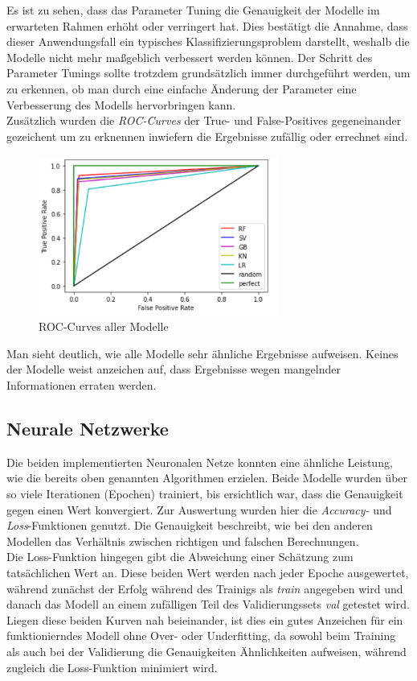 Es ist zu sehen, dass das Parameter Tuning die Genauigkeit der Modelle im erwarteten Rahmen erhöht oder 
verringert hat. Dies bestätigt die Annahme, dass dieser Anwendungsfall ein typisches Klassifizierungsproblem 
darstellt, weshalb die Modelle nicht mehr maßgeblich verbessert werden können. Der Schritt des Parameter Tunings 
sollte trotzdem grundsätzlich immer durchgeführt werden, um zu erkennen, ob man durch eine einfache Änderung 
der Parameter eine Verbesserung des Modells hervorbringen kann.\\

Zusätzlich wurden die \textit{ROC-Curves} der True- und False-Positives gegeneinander gezeichent um zu erknennen 
inwiefern die Ergebnisse zufällig oder errechnet sind.

\begin{figure}[h]
    \centering
    \includegraphics[width=0.7\textwidth]{pic/roc_curves.png}
    \caption{ROC-Curves aller Modelle}
    \label{fig:PT_eval}
\end{figure}

Man sieht deutlich, wie alle Modelle sehr ähnliche Ergebnisse aufweisen. Keines der Modelle weist anzeichen 
auf, dass Ergebnisse wegen mangelnder Informationen erraten werden.

\subsection{Neurale Netzwerke}
Die beiden implementierten Neuronalen Netze konnten eine ähnliche Leistung, wie die bereits oben genannten 
Algorithmen erzielen. Beide Modelle wurden über so viele Iterationen (Epochen) trainiert, bis ersichtlich war,
dass die Genauigkeit gegen einen Wert konvergiert. Zur Auswertung wurden hier die \textit{Accuracy-} und 
\textit{Loss}-Funktionen genutzt. Die Genauigkeit beschreibt, wie bei den anderen Modellen das Verhältnis
zwischen richtigen und falschen Berechnungen.\\
Die Loss-Funktion hingegen gibt die Abweichung einer Schätzung zum tatsächlichen Wert an. Diese beiden Wert 
werden nach jeder Epoche ausgewertet, während zunächst der Erfolg während des Trainigs als \textit{train}
angegeben wird und danach das Modell an einem zufälligen Teil des Validierungssets \textit{val} getestet wird.
Liegen diese beiden Kurven nah beieinander, ist dies ein gutes Anzeichen für ein funktionierndes Modell ohne 
Over- oder Underfitting, da sowohl beim Training als auch bei der Validierung die Genauigkeiten Ähnlichkeiten
aufweisen, während zugleich die Loss-Funktion minimiert wird.


